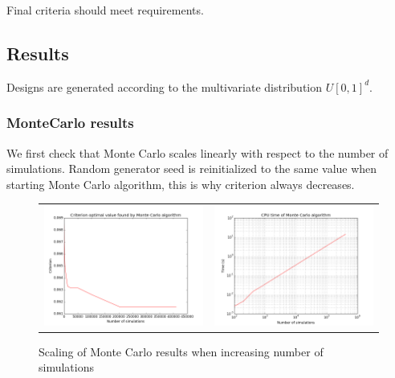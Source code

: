 Final criteria should meet requirements.

\subsection{Results}
Designs are generated according to the multivariate distribution $U[0,1]^d$.

\subsubsection{MonteCarlo results}

We first check that Monte Carlo scales linearly with respect to the number of simulations.
Random generator seed is reinitialized to the same value when starting Monte Carlo algorithm, this is why criterion always decreases.

\begin{figure}[!h]
\begin{center}
\begin{tabular}{cc}
 \includegraphics[scale=0.45]{lhs_mc_criterion.png} & \includegraphics[scale=0.45]{lhs_mc_cpu_time.png}
\end{tabular}
\end{center}
\caption{Scaling of Monte Carlo results when increasing number of simulations}
\label{mc_scaling}
\end{figure}


